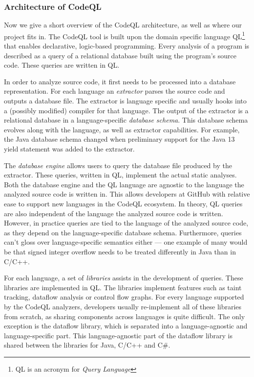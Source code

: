 \subsubsection*{Architecture of CodeQL}
Now we give a short overview of the CodeQL architecture, as well as where our
project fits in. 
The CodeQL tool is built upon the domain specific language QL\footnote{QL is an acronym for \emph{Query Language}}
that enables declarative, logic-based programming.
Every analysis of a program is described as a query of a relational database built using 
the program's source code. These queries are written in QL.

In order to analyze source code, it first needs to be processed into a database representation.
For each language an \emph{extractor} parses the source code and outputs a database file.
The extractor is language specific and usually hooks into a (possibly modified) compiler for that language.
The output of the extractor is a relational database in a language-specific \emph{database schema}.
This database schema evolves along with the language, as well as extractor capabilities.
For example, the Java database schema changed when preliminary support for the Java 13 yield statement was
added to the extractor.

The \emph{database engine} allows users to query the database file produced by the extractor.
These queries, written in QL, implement the actual static analyses.
Both the database engine and the QL language are agnostic to the language the analyzed source code 
is written in.
This allows developers at GitHub with relative ease to support new languages in the CodeQL ecosystem.
In theory, QL queries are also independent of the language the analyzed source code is written.
However, in practice queries are tied to the language of the analyzed source code,
as they depend on the language-specific database schema.
Furthermore, queries can't gloss over language-specific semantics either {---} one example of many would be
that signed integer overflow needs to be treated differently in Java than in C/C++.

For each language, a set of \emph{libraries} assists in the development of queries.
These libraries are implemented in QL.
The libraries implement features such as taint tracking, dataflow analysis or control flow graphs.
For every language supported by the CodeQL analyzers, developers usually re-implement all of these libraries from
scratch, as sharing components across languages is quite difficult.
The only exception is the dataflow library, which is separated into a language-agnostic and 
language-specific part.
This language-agnostic part of the dataflow library is shared between the libraries for Java, C/C++ and C\#.

